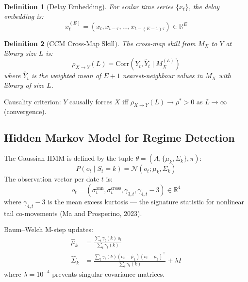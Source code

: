 \documentclass[11pt]{article}
\newtheorem{definition}{Definition}
\begin{document}
\begin{definition}[Delay Embedding]
For scalar time series $\{x_t\}$, the delay embedding is:
\begin{equation}
x_t^{(E)} = \left(x_t, x_{t-\tau}, \ldots, x_{t-(E-1)\tau}\right) \in \mathbb{R}^E
\label{eq:delay-embedding}
\end{equation}
\end{definition}

\begin{definition}[CCM Cross-Map Skill]
The cross-map skill from $M_X$ to $Y$ at library size $L$ is:
\begin{equation}
\rho_{X \to Y}(L) = \text{Corr}\left(Y_t, \hat{Y}_t \mid M_X^{(L)}\right)
\label{eq:ccm-skill}
\end{equation}
where $\hat{Y}_t$ is the weighted mean of $E+1$ nearest-neighbour values in $M_X$ with library of size $L$.
\end{definition}

Causality criterion: $Y$ causally forces $X$ iff $\rho_{X \to Y}(L) \to \rho^* > 0$ as $L \to \infty$ (convergence).

\subsection{Hidden Markov Model for Regime Detection}

The Gaussian HMM is defined by the tuple $\theta = (A, \{\mu_k, \Sigma_k\}, \pi)$:
\begin{equation}
P(o_t \mid S_t = k) = \mathcal{N}(o_t; \mu_k, \Sigma_k)
\label{eq:hmm-emission}
\end{equation}
The observation vector per date $t$ is:
\begin{equation}
o_t = \left(\sigma_t^{\text{ann}}, \sigma_t^{\text{cross}}, \gamma_{3,t}, \gamma_{4,t} - 3\right) \in \mathbb{R}^4
\label{eq:hmm-obs}
\end{equation}
where $\gamma_{4,t} - 3$ is the mean excess kurtosis --- the signature statistic for nonlinear tail co-movements (Ma and Prosperino, 2023).

Baum--Welch M-step updates:
\begin{align}
\hat{\mu}_k &= \frac{\sum_t \gamma_t(k)\, o_t}{\sum_t \gamma_t(k)} \label{eq:baum-welch-mu} \\
\hat{\Sigma}_k &= \frac{\sum_t \gamma_t(k)(o_t - \hat{\mu}_k)(o_t - \hat{\mu}_k)^\top}{\sum_t \gamma_t(k)} + \lambda I \label{eq:baum-welch-sigma}
\end{align}
where $\lambda = 10^{-4}$ prevents singular covariance matrices.
\end{document}
